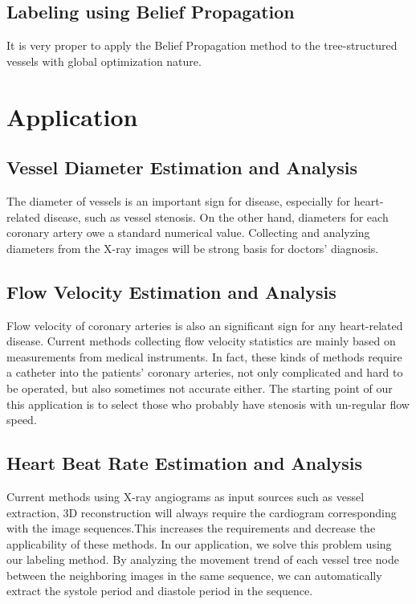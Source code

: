 \documentclass[journal]{IEEEtran}
\begin{document}
\subsection{Labeling using Belief Propagation}
It is very proper to apply the Belief Propagation method to the tree-structured vessels with global optimization nature.

\section{Application}
\label{sec:application}
\subsection{Vessel Diameter Estimation and Analysis}
The diameter of vessels is an important sign for disease, especially for heart-related disease, such as vessel stenosis. On the other hand, diameters for each coronary artery owe a standard numerical value. Collecting and analyzing diameters from the X-ray images will be strong basis for doctors' diagnosis.

\subsection{Flow Velocity Estimation and Analysis}
Flow velocity of coronary arteries is also an significant sign for any heart-related disease. Current methods collecting flow velocity statistics are mainly based on measurements from medical instruments. In fact, these kinds of methods require a catheter into the patients' coronary arteries, not only complicated and hard to be operated, but also sometimes not accurate either. The starting point of our this application is to select those who probably have stenosis with un-regular flow speed.

\subsection{Heart Beat Rate Estimation and Analysis}
Current methods using X-ray angiograms as input sources such as vessel extraction, 3D reconstruction will always require the cardiogram corresponding with the image sequences.This increases the requirements and decrease the applicability of these methods. In our application, we solve this problem using our labeling method. By analyzing the movement trend of each vessel tree node between the neighboring images in the same sequence, we can automatically extract the systole period and diastole period in the sequence.
\end{document}
